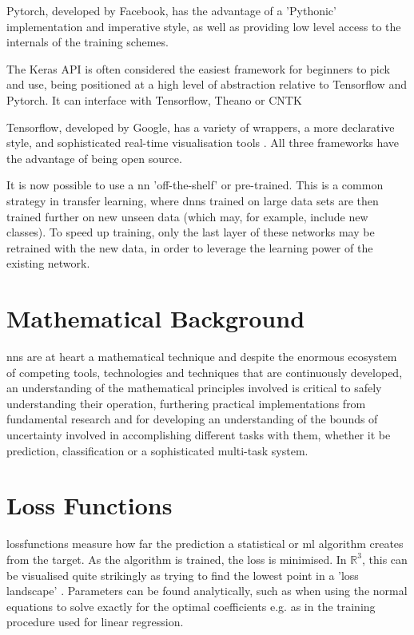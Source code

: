 Pytorch, developed by Facebook, has the advantage of a 'Pythonic' implementation and imperative style, as well as providing low level access to the internals of the training schemes.
\bigskip

The Keras API is often considered the easiest framework for beginners to pick and use, being positioned at a high level of abstraction relative to Tensorflow and Pytorch. It can interface with Tensorflow, Theano or CNTK  
\bigskip

Tensorflow, developed by Google, has a variety of wrappers, a more declarative style, and sophisticated real-time visualisation tools \cite{tale_dl}. All three frameworks have the advantage of being open source. 
\bigskip

It is now possible to use a  \gls{nn} 'off-the-shelf' or pre-trained. This is a common strategy in transfer learning, where \gls{dnn}s trained on large data sets are then trained further on new unseen data (which may, for example, include new classes). To speed up training, only the last layer of these networks may be retrained with the new data, in order to leverage the learning power of the existing network. 
\bigskip

\section*{Mathematical Background}


\gls{nn}s are at heart a mathematical technique and despite the enormous ecosystem of competing tools, technologies and techniques that are continuously developed, an understanding of the mathematical principles involved  is critical to safely understanding their operation, furthering practical implementations from fundamental research and for developing an understanding of the bounds of uncertainty involved in accomplishing different tasks with them, whether it be prediction, classification or a sophisticated multi-task system.

\section{Loss Functions}

\gls{lossfunction}s measure how far the prediction a statistical or \gls{ml} algorithm creates from the target. As the algorithm is trained, the loss is minimised. In $\mathds{R}^3$, this can be visualised quite strikingly as trying to find the lowest point in a 'loss landscape' \cite{loss_landscape}. Parameters can be found analytically, such as when using the normal equations to solve exactly for the optimal coefficients e.g. as in the training procedure used for linear regression.
\bigskip

